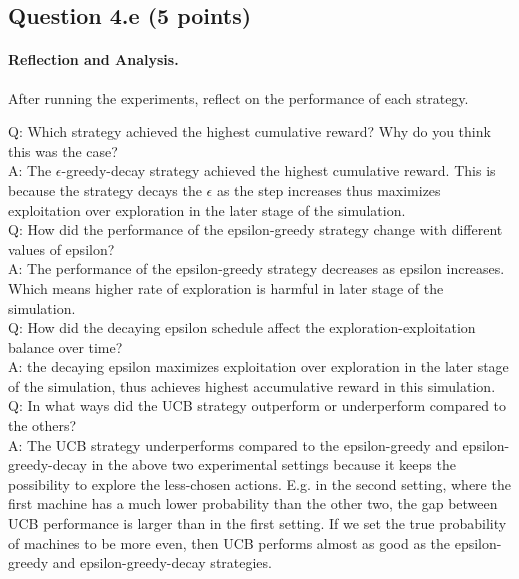 \documentclass[12pt]{article}
\begin{document}
\subsection*{Question 4.e (5 points) } 
\paragraph{Reflection and Analysis.}
After running the experiments, reflect on the performance of each strategy.
\begin{solution}
Q: Which strategy achieved the highest cumulative reward? Why do you think this was the case?\\
A: The $\epsilon$-greedy-decay strategy achieved the highest cumulative reward. This is because the strategy decays the $\epsilon$ as the step increases thus maximizes exploitation over exploration in the later stage of the simulation. \\
Q: How did the performance of the epsilon-greedy strategy change with different values of epsilon?\\
A: The performance of the epsilon-greedy strategy decreases as epsilon increases. Which means higher rate of exploration is harmful in later stage of the simulation.\\
Q: How did the decaying epsilon schedule affect the exploration-exploitation balance over time? \\
A: the decaying epsilon maximizes exploitation over exploration in the later stage of the simulation, thus achieves highest accumulative reward in this simulation. \\
Q: In what ways did the UCB strategy outperform or underperform compared to the others? \\
A: The UCB strategy underperforms compared to the epsilon-greedy and epsilon-greedy-decay in the above two experimental settings because it keeps the possibility to explore the less-chosen actions. E.g. in the second setting, where the first machine has a much lower probability than the other two, the gap between UCB performance is larger than in the first setting. If we set the true probability of machines to be more even, then UCB performs almost as good as the epsilon-greedy and epsilon-greedy-decay strategies.
\end{solution}
\end{document}
